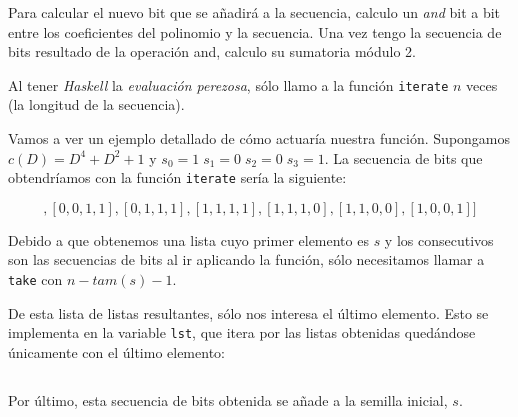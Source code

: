 \documentclass[10pt,spanish]{article}
\begin{document}
Para calcular el nuevo bit que se añadirá a la secuencia, calculo un \textit{\textcolor{azul}{and}} bit a bit entre los coeficientes del polinomio y la secuencia. Una vez tengo la secuencia de bits resultado de la operación and, calculo su sumatoria módulo 2. 

Al tener \textit{\textcolor{azul}{Haskell}} la \textit{\textcolor{azul}{evaluación perezosa}}, sólo llamo a la función \texttt{iterate} $n$ veces (la longitud de la secuencia).

Vamos a ver un ejemplo detallado de cómo actuaría nuestra función. Supongamos $c(D) = D^4 + D^2 + 1$ y $s_0 = 1 \; s_1 = 0 \; s_2 = 0 \; s_3 = 1$. La secuencia de bits que obtendríamos con la función \texttt{iterate} sería la siguiente:

\begin{displaymath}
[[1,0,0,1],[0,0,1,1],[0,1,1,1],[1,1,1,1],[1,1,1,0],[1,1,0,0],[1,0,0,1]]
\end{displaymath}

Debido a que obtenemos una lista cuyo primer elemento es $s$ y los consecutivos son las secuencias de bits al ir aplicando la función, sólo necesitamos llamar a \texttt{take} con $n - tam(s)-1$. 

De esta lista de listas resultantes, sólo nos interesa el último elemento. Esto se implementa en la variable \texttt{lst}, que itera por las listas obtenidas quedándose únicamente con el último elemento:

\begin{displaymath}
[1,1,1,0,0,1]
\end{displaymath}

Por último, esta secuencia de bits obtenida se añade a la semilla inicial, $s$.
\end{document}
